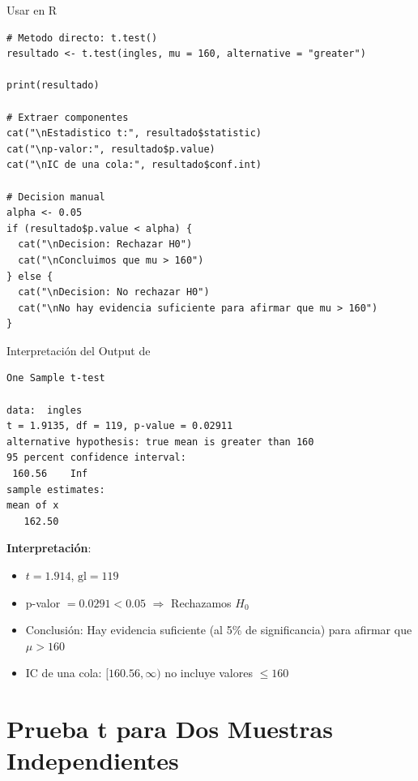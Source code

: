 \documentclass[aspectratio=169, 11pt]{beamer}
\begin{document}
\begin{frame}[fragile]{Usar  en R}
\begin{lstlisting}[basicstyle=\ttfamily\scriptsize]
# Metodo directo: t.test()
resultado <- t.test(ingles, mu = 160, alternative = "greater")

print(resultado)

# Extraer componentes
cat("\nEstadistico t:", resultado$statistic)
cat("\np-valor:", resultado$p.value)
cat("\nIC de una cola:", resultado$conf.int)

# Decision manual
alpha <- 0.05
if (resultado$p.value < alpha) {
  cat("\nDecision: Rechazar H0")
  cat("\nConcluimos que mu > 160")
} else {
  cat("\nDecision: No rechazar H0")
  cat("\nNo hay evidencia suficiente para afirmar que mu > 160")
}
\end{lstlisting}
\end{frame}

\begin{frame}[fragile]{Interpretación del Output de }
\begin{lstlisting}[basicstyle=\ttfamily\footnotesize]
	One Sample t-test

data:  ingles
t = 1.9135, df = 119, p-value = 0.02911
alternative hypothesis: true mean is greater than 160
95 percent confidence interval:
 160.56    Inf
sample estimates:
mean of x
   162.50
\end{lstlisting}

\vspace{0.3cm}
\textbf{Interpretación}:
\begin{itemize}
  \item $t = 1.914$, $\text{gl} = 119$
  \item p-valor $= 0.0291 < 0.05$ $\Rightarrow$ \alert{Rechazamos $H_0$}
  \item Conclusión: Hay evidencia suficiente (al 5\% de significancia) para afirmar que $\mu > 160$
  \item IC de una cola: $[160.56, \infty)$ no incluye valores $\leq 160$
\end{itemize}
\end{frame}

\section{Prueba t para Dos Muestras Independientes}
\end{document}
